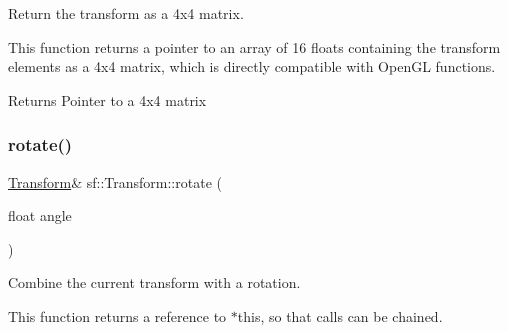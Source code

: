 Return the transform as a 4x4 matrix. 

This function returns a pointer to an array of 16 floats containing the transform elements as a 4x4 matrix, which is directly compatible with Open\+GL functions.


\begin{DoxyCode}{0}
\end{DoxyCode}


\begin{DoxyReturn}{Returns}
Pointer to a 4x4 matrix \begin{DoxyVerb}\end{DoxyVerb}
 
\end{DoxyReturn}
\mbox{\label{classsf_1_1_transform_a3e548c3c9e3fb9d4bd43cf852669e555}} 
\subsubsection{\texorpdfstring{rotate()}{rotate()}\hspace{0.1cm}{\footnotesize\ttfamily [1/3]}}
{\footnotesize\ttfamily \mbox{\hyperlink{classsf_1_1_transform}{Transform}}\& sf\+::\+Transform\+::rotate (\begin{DoxyParamCaption}\item[{float}]{angle }\end{DoxyParamCaption})}



Combine the current transform with a rotation. 

This function returns a reference to $\ast$this, so that calls can be chained. 
\begin{DoxyCode}{0}
\end{DoxyCode}



